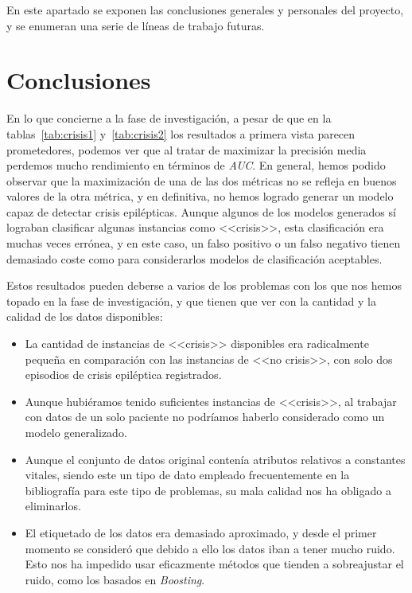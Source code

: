 
En este apartado se exponen las conclusiones generales y personales del proyecto, y se enumeran una serie de líneas de trabajo futuras. 

\section{Conclusiones}

En lo que concierne a la fase de investigación, a pesar de que en la tablas~\ref{tab:crisis1} y~\ref{tab:crisis2} los resultados a primera vista parecen prometedores, podemos ver que al tratar de maximizar la precisión media perdemos mucho rendimiento en términos de \textit{AUC}. En general, hemos podido observar que la maximización de una de las dos métricas no se refleja en buenos valores de la otra métrica, y en definitiva, no hemos logrado generar un modelo capaz de detectar crisis epilépticas. Aunque algunos de los modelos generados sí lograban clasificar algunas instancias como <<crisis>>, esta clasificación era muchas veces errónea, y en este caso, un falso positivo o un falso negativo tienen demasiado coste como para considerarlos modelos de clasificación aceptables. 

Estos resultados pueden deberse a varios de los problemas con los que nos hemos topado en la fase de investigación, y que tienen que ver con la cantidad y la calidad de los datos disponibles: 

\begin{itemize}
	\item La cantidad de instancias de <<crisis>> disponibles era radicalmente pequeña en comparación con las instancias de <<no crisis>>, con solo dos episodios de crisis epiléptica registrados. 
	\item Aunque hubiéramos tenido suficientes instancias de <<crisis>>, al trabajar con datos de un solo paciente no podríamos haberlo considerado como un modelo generalizado. 
	\item Aunque el conjunto de datos original contenía atributos relativos a constantes vitales, siendo este un tipo de dato empleado frecuentemente en la bibliografía para este tipo de problemas, su mala calidad nos ha obligado a eliminarlos. 
	\item El etiquetado de los datos era demasiado aproximado, y desde el primer momento se consideró que debido a ello los datos iban a tener mucho ruido. Esto nos ha impedido usar eficazmente métodos que tienden a sobreajustar el ruido, como los basados en \textit{Boosting}. 
\end{itemize}

